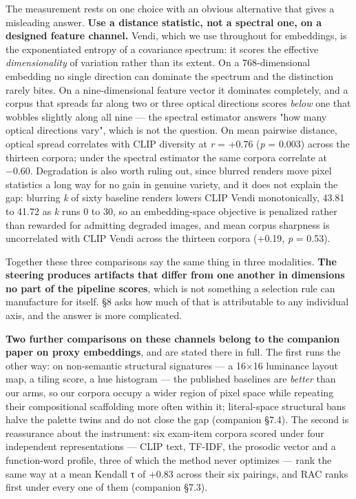 \documentclass[
  10pt,
]{article}
\theoremstyle{plain}
\theoremstyle{definition}
\begin{document}
The measurement rests on one choice with an obvious alternative that
gives a misleading answer. \textbf{Use a distance statistic, not a
spectral one, on a designed feature channel.} Vendi, which we use
throughout for embeddings, is the exponentiated entropy of a covariance
spectrum: it scores the effective \emph{dimensionality} of variation
rather than its extent. On a 768-dimensional embedding no single
direction can dominate the spectrum and the distinction rarely bites. On
a nine-dimensional feature vector it dominates completely, and a corpus
that spreads far along two or three optical directions scores
\emph{below} one that wobbles slightly along all nine --- the spectral
estimator answers "how many optical directions vary", which is not the
question. On mean pairwise distance, optical spread correlates with CLIP
diversity at \emph{r} = +0.76 (\emph{p} = 0.003) across the thirteen
corpora; under the spectral estimator the same corpora correlate at
−0.60. Degradation is also worth ruling out, since blurred renders move
pixel statistics a long way for no gain in genuine variety, and it does
not explain the gap: blurring \emph{k} of sixty baseline renders lowers
CLIP Vendi monotonically, 43.81 to 41.72 as \emph{k} runs 0 to 30, so an
embedding-space objective is penalized rather than rewarded for
admitting degraded images, and mean corpus sharpness is uncorrelated
with CLIP Vendi across the thirteen corpora (+0.19, \emph{p} = 0.53).

Together these three comparisons say the same thing in three modalities.
\textbf{The steering produces artifacts that differ from one another in
dimensions no part of the pipeline scores}, which is not something a
selection rule can manufacture for itself. §8 asks how much of that is
attributable to any individual axis, and the answer is more complicated.

\textbf{Two further comparisons on these channels belong to the
companion paper on proxy embeddings}, and are stated there in full. The
first runs the other way: on non-semantic structural signatures --- a
16×16 luminance layout map, a tiling score, a hue histogram --- the
published baselines are \emph{better} than our arms, so our corpora
occupy a wider region of pixel space while repeating their compositional
scaffolding more often within it; literal-space structural bans halve
the palette twins and do not close the gap (companion §7.4). The second
is reassurance about the instrument: six exam-item corpora scored under
four independent representations --- CLIP text, TF-IDF, the prosodic
vector and a function-word profile, three of which the method never
optimizes --- rank the same way at a mean Kendall τ of +0.83 across
their six pairings, and RAC ranks first under every one of them
(companion §7.3).
\end{document}
